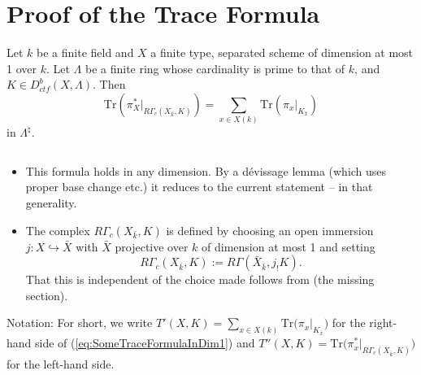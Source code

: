
\section{Proof of the Trace Formula}

\begin{theorem} \label{thm:SomeTraceFormulaInDim1}
Let $k$ be a finite field and $X$ a finite type, separated scheme of dimension 
at most 1 over $k$. Let $\Lambda$ be a finite ring whose cardinality is prime 
to that of $k$, and $K\in D_{ctf}^b(X, \Lambda)$. Then
\begin{equation} \label{eq:SomeTraceFormulaInDim1}
\text{Tr}\left(\pi_X^*\big|_{R\Gamma_c(X_{\bar k}, K)}\right) = \sum_{x\in 
X(k)} \text{Tr}\left(\pi_x\big|_{K_{\bar x}}\right)
\end{equation}
in $\Lambda^{\natural}$. 
\end{theorem}

\begin{remark} $ $
\begin{itemize}
\item 
This formula holds in any dimension. By a d\'evissage lemma (which uses proper 
base change etc.) it reduces to the current statement -- in that generality.
\item 
The complex $R\Gamma_c(X_{\bar k}, K)$ is defined by choosing an open immersion 
$j: X \hookrightarrow \bar X$ with $\bar X$ projective over $k$ of dimension at 
most 1 and setting
$$
R\Gamma_c(X_{\bar k}, K) := R\Gamma(\bar X_{\bar k}, j_!K).
$$
That this is independent of the choice made follows from (the missing section).
\end{itemize}
\end{remark}

Notation:
For short, we write $T'(X, K) = \sum_{x\in X(k)} 
\text{Tr}\big(\pi_x\big|_{K_{\bar x}}\big)$ for the right-hand side of 
(\ref{eq:SomeTraceFormulaInDim1}) and $T''(X, K) 
=\text{Tr}\big(\pi_x^*\big|_{R\Gamma_c(X_{\bar k}, K)}\big)$ for the left-hand 
side.


